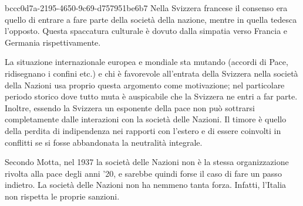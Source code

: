 \documentclass[preview]{standalone}
\begin{document}
\begin{snippet}{bccc0d7a-2195-4650-9c69-d757951be6b7}
    Nella Svizzera francese il consenso era quello di entrare a fare parte della società
    della nazione, mentre in quella tedesca l'opposto.
    Questa spaccatura culturale è dovuto dalla simpatia verso Francia e Germania
    rispettivamente.
    
    La situazione internazionale europea e mondiale sta mutando (accordi di Pace,
    ridisegnano i confini etc.) e chi è favorevole all'entrata della
    Svizzera nella società della Nazioni usa proprio questa argomento come motivazione;
    nel particolare periodo storico dove tutto muta è auspicabile che la Svizzera
    ne entri a far parte. Inoltre, essendo la Svizzera un esponente della pace
    non può sottrarsi completamente dalle interazioni con la società delle Nazioni.
    Il timore è quello della perdita di indipendenza nei rapporti con l'estero
    e di essere coinvolti in conflitti se si fosse abbandonata la neutralità integrale.
    
    Secondo Motta, nel 1937 la società delle Nazioni non è la stessa organizzazione
    rivolta alla pace degli anni '20, e sarebbe quindi forse il caso di fare un passo indietro.
    La società delle Nazioni non ha nemmeno tanta forza. Infatti, l'Italia non rispetta
    le proprie sanzioni. 
\end{snippet}
\end{document}
